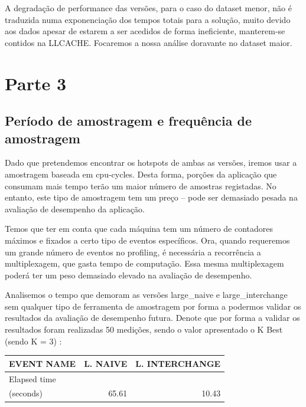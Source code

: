 \documentclass[conference,compsoc]{IEEEtran}
\begin{document}
  A degradação de performance das versões, para o caso do dataset menor, não é traduzida numa exponenciação dos tempos totais para a solução, muito devido aos dados  apesar de estarem a ser acedidos de forma ineficiente, manterem-se contidos na LLCACHE. Focaremos a nossa análise doravante no dataset maior.\par 






  \section{Parte 3 }

  \subsection{Período de amostragem e frequência de amostragem}

  Dado que pretendemos encontrar os hotspots de ambas as versões, iremos usar a amostragem baseada em cpu-cycles. Desta forma, porções da aplicação que consumam mais tempo terão um maior número de amostras registadas. No entanto, este tipo de amostragem tem um preço -- pode ser demasiado pesada na avaliação de desempenho da aplicação. \par 

  Temos que ter em conta que cada máquina tem um número de contadores máximos e fixados a certo tipo de eventos específicos. Ora, quando requeremos um grande número de eventos no profiling, é necessária a recorrência a multiplexagem, que gasta tempo de computação. Essa mesma multiplexagem poderá ter um peso demasiado elevado na avaliação de desempenho.\par 


  Analisemos o tempo que demoram as versões large\_naive e large\_interchange sem qualquer tipo de ferramenta de amostragem por forma a podermos validar os resultados da avaliação de desempenho futura. Denote que por forma a validar os resultados foram realizadas 50 medições, sendo o valor apresentado o K Best (sendo K = 3) :

    \begin{table}[H]
    \label{table:base_rates}
    \centering
    \begin{tabular}{ | l | r | r |   }

    \hline
    EVENT NAME	 & L. NAIVE  & L. INTERCHANGE \\ \hline 
    Elapsed time & & \\ (seconds) &  65.61 & 10.43 \\ \hline    
    \end{tabular}
    \end{table}
\end{document}

